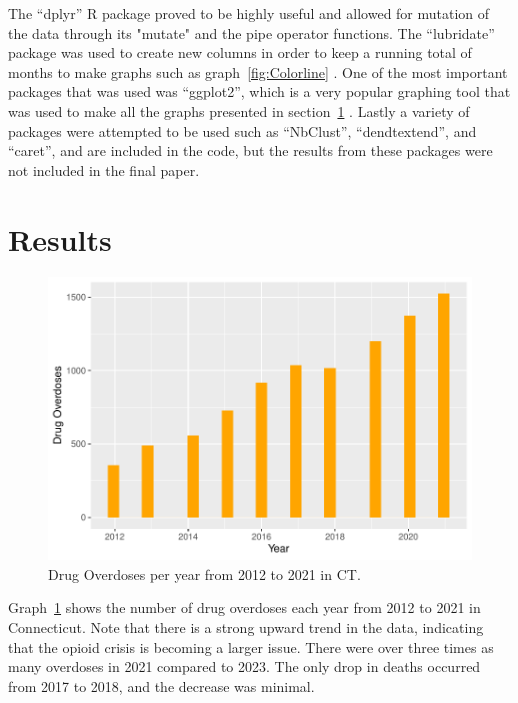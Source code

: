 \documentclass[12pt, letterpaper, titlepage]{article}
\begin{document}
The ``dplyr'' R package proved to be highly useful and allowed for mutation of the data through its "mutate" and the pipe operator functions\citep{dplyr}.  The ``lubridate'' package was used to create new columns in order to keep a running total of months to make graphs such as graph~\ref{fig:Colorline} \citep{lubridate}.  One of the most important packages that was used was ``ggplot2'', which is a very popular graphing tool that was used to make all the graphs presented in section~\ref{sec:Results} \citep{ggplot2}.  Lastly a variety of packages were attempted to be used such as ``NbClust'', ``dendtextend'', and ``caret'', and are included in the code, but the results from these packages were not included in the final paper.




\section{Results} \label{sec:Results}

\begin{figure}[tbp]
    \centering
    \includegraphics{OD_per_year}
    \caption{Drug Overdoses per year from 2012 to 2021 in CT.}
    \label{fig:OD_per_year}
  \end{figure}

Graph~\ref{fig:OD_per_year} shows the number of drug overdoses each year from 2012 to 2021 in Connecticut.  Note that there is a strong upward trend in the data, indicating that the opioid crisis is becoming a larger issue.  There were over three times as many overdoses in 2021 compared to 2023.  The only drop in deaths occurred from 2017 to 2018, and the decrease was minimal.
\end{document}
